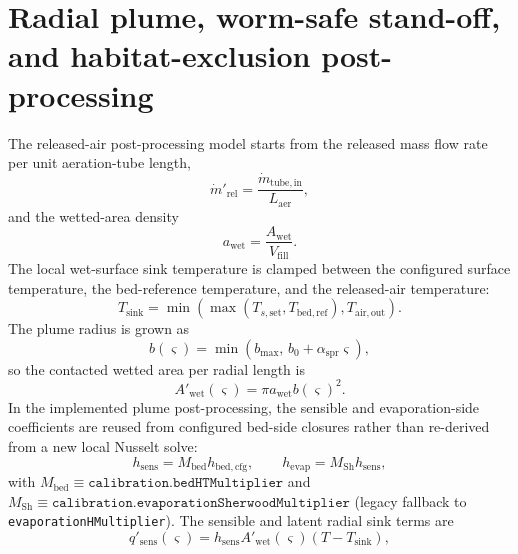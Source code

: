 \documentclass[11pt]{article}
\begin{document}
\section{Radial plume, worm-safe stand-off, and habitat-exclusion post-processing}
The released-air post-processing model starts from the released mass flow rate per unit aeration-tube length,
\begin{equation}
\label{eq:release_per_length}
\dot m'_{\mathrm{rel}}=\frac{\dot m_{\mathrm{tube,in}}}{L_{\mathrm{aer}}},
\end{equation}
and the wetted-area density
\begin{equation}
\label{eq:wetted_area_density}
a_{\mathrm{wet}}=\frac{A_{\mathrm{wet}}}{V_{\mathrm{fill}}}.
\end{equation}
The local wet-surface sink temperature is clamped between the configured surface temperature, the bed-reference temperature, and the released-air temperature:
\begin{equation}
\label{eq:plume_sink_temperature}
T_{\mathrm{sink}}=\min\!\left(\max(T_{s,\mathrm{set}},T_{\mathrm{bed,ref}}),T_{\mathrm{air,out}}\right).
\end{equation}
The plume radius is grown as
\begin{equation}
\label{eq:plume_radius}
b(\varsigma)=\min\!\left(b_{\max},\,b_0+\alpha_{\mathrm{spr}}\varsigma\right),
\end{equation}
so the contacted wetted area per radial length is
\begin{equation}
\label{eq:plume_contact_area}
A'_{\mathrm{wet}}(\varsigma)=\pi a_{\mathrm{wet}}b(\varsigma)^2.
\end{equation}
In the implemented plume post-processing, the sensible and evaporation-side coefficients are reused from configured bed-side closures rather than re-derived from a new local Nusselt solve:
\begin{equation}
\label{eq:plume_hsens_hevap}
h_{\mathrm{sens}}=M_{\mathrm{bed}}h_{\mathrm{bed,cfg}},\qquad h_{\mathrm{evap}}=M_{\mathrm{Sh}}h_{\mathrm{sens}},
\end{equation}
with \(M_{\mathrm{bed}}\equiv\texttt{calibration.bedHTMultiplier}\) and \(M_{\mathrm{Sh}}\equiv\texttt{calibration.evaporationSherwoodMultiplier}\) (legacy fallback to \texttt{evaporationHMultiplier}).
The sensible and latent radial sink terms are
\begin{equation}
\label{eq:plume_sensible_sink}
q'_{\mathrm{sens}}(\varsigma)=h_{\mathrm{sens}}A'_{\mathrm{wet}}(\varsigma)\left(T-T_{\mathrm{sink}}\right),
\end{equation}
\end{document}
